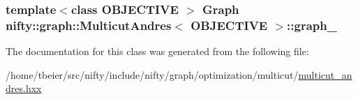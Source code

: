 \subsubsection[{graph\+\_\+}]{\setlength{\rightskip}{0pt plus 5cm}template$<$class O\+B\+J\+E\+C\+T\+I\+V\+E $>$ {\bf Graph} {\bf nifty\+::graph\+::\+Multicut\+Andres}$<$ O\+B\+J\+E\+C\+T\+I\+V\+E $>$\+::graph\+\_\+\hspace{0.3cm}{\ttfamily [protected]}}\label{classnifty_1_1graph_1_1MulticutAndres_a883767b0afbd1a256949ef3238093399}


The documentation for this class was generated from the following file\+:\begin{DoxyCompactItemize}
\item 
/home/tbeier/src/nifty/include/nifty/graph/optimization/multicut/\hyperlink{multicut__andres_8hxx}{multicut\+\_\+andres.\+hxx}\end{DoxyCompactItemize}
